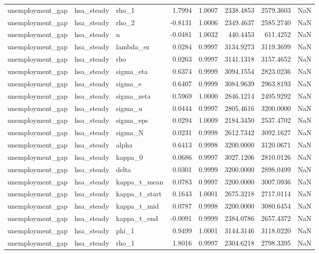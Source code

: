 \begin{tabular}{lllrrrrl}
unemployment\_gap & hsa\_steady & rho\_1 & 1.7994 & 1.0007 & 2338.4853 & 2579.3603 & NaN \\
unemployment\_gap & hsa\_steady & rho\_2 & -0.8131 & 1.0006 & 2349.4637 & 2585.2740 & NaN \\
unemployment\_gap & hsa\_steady & n & -0.0481 & 1.0032 & 440.4453 & 611.4252 & NaN \\
unemployment\_gap & hsa\_steady & lambda\_ez & 0.0284 & 0.9997 & 3134.9273 & 3119.3699 & NaN \\
unemployment\_gap & hsa\_steady & rho & 0.0263 & 0.9997 & 3141.1318 & 3157.4652 & NaN \\
unemployment\_gap & hsa\_steady & sigma\_eta & 0.6374 & 0.9999 & 3094.1554 & 2823.0236 & NaN \\
unemployment\_gap & hsa\_steady & sigma\_e & 0.6407 & 0.9999 & 3084.9639 & 2963.8193 & NaN \\
unemployment\_gap & hsa\_steady & sigma\_zeta & 0.5969 & 1.0000 & 2846.1214 & 2495.9292 & NaN \\
unemployment\_gap & hsa\_steady & sigma\_u & 0.0444 & 0.9997 & 2805.4616 & 3200.0000 & NaN \\
unemployment\_gap & hsa\_steady & sigma\_eps & 0.0294 & 1.0009 & 2184.3450 & 2537.4702 & NaN \\
unemployment\_gap & hsa\_steady & sigma\_N & 0.0231 & 0.9998 & 2612.7342 & 3092.1627 & NaN \\
unemployment\_gap & hsa\_steady & alpha & 0.6413 & 0.9998 & 3200.0000 & 3120.0671 & NaN \\
unemployment\_gap & hsa\_steady & kappa\_0 & 0.0686 & 0.9997 & 3027.1206 & 2810.0126 & NaN \\
unemployment\_gap & hsa\_steady & delta & 0.0301 & 0.9999 & 3200.0000 & 2898.0499 & NaN \\
unemployment\_gap & hsa\_steady & kappa\_t\_mean & 0.0783 & 0.9997 & 3200.0000 & 3007.0936 & NaN \\
unemployment\_gap & hsa\_steady & kappa\_t\_start & 0.1643 & 1.0001 & 2675.3218 & 2717.0114 & NaN \\
unemployment\_gap & hsa\_steady & kappa\_t\_mid & 0.0787 & 0.9998 & 3200.0000 & 3080.6454 & NaN \\
unemployment\_gap & hsa\_steady & kappa\_t\_end & -0.0091 & 0.9999 & 2384.0786 & 2657.4372 & NaN \\
unemployment\_gap & hsa\_steady & phi\_1 & 0.9499 & 1.0001 & 3144.3146 & 3118.0220 & NaN \\
unemployment\_gap & hsa\_steady & rho\_1 & 1.8016 & 0.9997 & 2304.6218 & 2798.3395 & NaN \\

\end{tabular}
